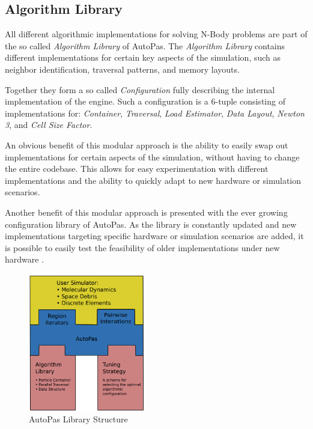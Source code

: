 \documentclass[conference]{IEEEtran}
\begin{document}
\subsection{Algorithm Library}

All different algorithmic implementations for solving N-Body problems are part of the so called \textit{Algorithm Library} of AutoPas. The \textit{Algorithm Library} contains different implementations for certain key aspects of the simulation, such as neighbor identification, traversal patterns, and memory layouts.

Together they form a so called \textit{Configuration} fully describing the internal implementation of the engine. Such a configuration is a 6-tuple consisting of implementations for: \textit{Container}, \textit{Traversal}, \textit{Load Estimator}, \textit{Data Layout}, \textit{Newton 3}, and \textit{Cell Size Factor}.

An obvious benefit of this modular approach is the ability to easily swap out implementations for certain aspects of the simulation, without having to change the entire codebase. This allows for easy experimentation with different implementations and the ability to quickly adapt to new hardware or simulation scenarios.

Another benefit of this modular approach is presented with the ever growing configuration library of AutoPas. As the library is constantly updated and new implementations targeting specific hardware or simulation scenarios are added, it is possible to easily test the feasibility of older implementations
under new hardware \cite{Tchipev2020}.


\begin{figure}[h]
    \centering
    \includegraphics[width=2in]{figures/AutoPasLibraryStructure.png}
    \caption{AutoPas Library Structure \cite{Newcome2023Poster}}
    \label{fig_architecture}
\end{figure}
\end{document}
